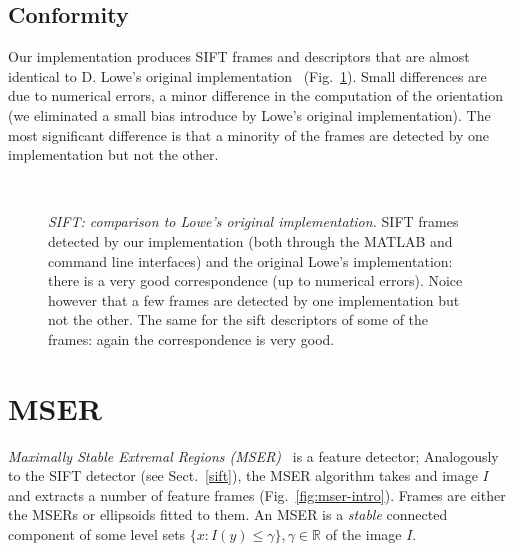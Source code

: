 \documentclass[9.5pt]{article}
\newcommand{\real}{\ensuremath{\mathbb{R}}}
\begin{document}
\subsection{Conformity}\label{sift.conformity}

Our implementation produces SIFT frames and descriptors that are
almost identical to D. Lowe's original
implementation~\cite{lowe07sift}
(Fig.~\ref{fig:sift-conformity}). Small differences are due to
numerical errors, a minor difference in the computation of the
orientation (we eliminated a small bias introduce by Lowe's original
implementation).  The most significant difference is that a minority
of the frames are detected by one implementation but not the other.

\begin{figure}
\begin{center}
\hfill
{}\\
\end{center}
\caption{ {\em SIFT: comparison to Lowe's original implementation.}
  \protect{} SIFT frames detected by our
  implementation (both through the MATLAB and command line interfaces)
  and the original Lowe's implementation: there is a very good
  correspondence (up to numerical errors).  Noice however that a few
  frames are detected by one implementation but not the other.
  \protect{} The same for the sift descriptors of some
  of the frames: again the correspondence is very good.}
\label{fig:sift-conformity}
\end{figure}

\section{MSER}\label{mser}

{\em Maximally Stable Extremal Regions (MSER)}~\cite{matas03robust} is
a feature detector; Analogously to the SIFT detector (see
Sect.~\ref{sift}), the MSER algorithm takes and image $I$ and extracts
a number of feature frames (Fig.~\ref{fig:mser-intro}). Frames are
either the MSERs or ellipsoids fitted to them. An MSER is a {\em
  stable} connected component of some level sets
$\{x:I(y)\leq\gamma\}, \gamma\in\real$ of the image $I$.
\end{document}

